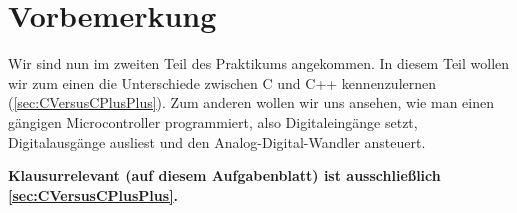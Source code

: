 \section*{Vorbemerkung}

Wir sind nun im zweiten Teil des Praktikums angekommen.
In diesem Teil wollen wir zum einen die Unterschiede zwischen C und C++ kennenzulernen (\ref{sec:CVersusCPlusPlus}).
Zum anderen wollen wir uns ansehen, wie man einen gängigen Microcontroller programmiert, also Digitaleingänge setzt, Digitalausgänge ausliest und den Analog-Digital-Wandler ansteuert.

\textbf{Klausurrelevant (auf diesem Aufgabenblatt) ist ausschließlich \ref{sec:CVersusCPlusPlus}.}